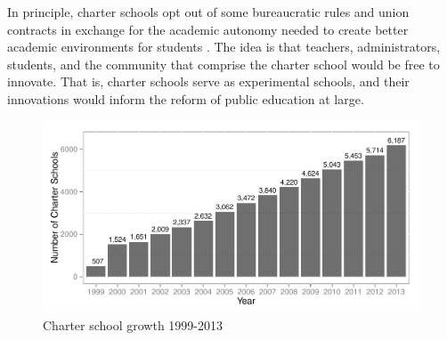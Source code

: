 \documentclass[letterpaper,12p,twoside]{article} %
\begin{document}
In principle, charter schools opt out of some bureaucratic rules and union contracts in exchange for the academic autonomy needed to create better academic environments for students \cite{wells2002}. The idea is that  teachers, administrators, students, and the community that comprise the charter school would be free to innovate. That is, charter schools serve as experimental schools, and their innovations would inform the reform of public education at large.

\begin{figure}[tp]
\includegraphics[width=\textwidth]{../Figures/CharterSchoolGrowth.pdf}
\caption{Charter school growth 1999-2013}
\label{fig:charterSchoolGrowth}
\end{figure}


\end{document}
